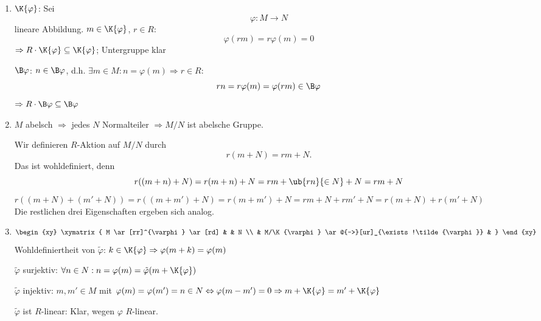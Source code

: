\begin{Bew}
\begin{enumerate}
\item $\K{\varphi}$: Sei 
\[
\varphi: M \to N
\]
 lineare Abbildung. $m \in \K{\varphi}$, $r \in R$:
\[
\varphi(rm) = r\varphi(m) = 0
\] 
$\Rightarrow R \cdot \K{\varphi} \subseteq \K{\varphi}$; Untergruppe klar

$\B\varphi$: $n \in \B\varphi$, d.h. $\exists m\in M: n =
\varphi (m) \Rightarrow r \in R:$
\[
rn = r \varphi(m) = \varphi(rm) \in \B\varphi
\]
$\Rightarrow R
\cdot \B\varphi \subseteq \B\varphi$
\item $M$ abelsch $\Rightarrow$ jedes $N$ Normalteiler $\Rightarrow M/N$ ist
abelsche Gruppe.

Wir definieren $R$-Aktion auf $M/N$ durch
\[
r(m + N) = rm + N.
\]
Das ist wohldefiniert, denn
\[
r((m+n)+N)=r(m+n) + N= rm + \ub{rn}{\in N} + N = rm + N
\]
$r((m+N) + (m' + N ) ) = r((m+m')+N) = r(m+m') + N = rm + N + rm' + N =
r(m+N) + r(m'+N)$\\
Die restlichen drei Eigenschaften ergeben sich analog.
  
\item
$$\begin{xy}
\xymatrix{
M \ar[rr]^{\varphi} \ar[rd] &     &  N \\
&  M/\K{\varphi} \ar@{-->}[ur]_{\exists!\tilde{\varphi}}  & }
\end{xy}$$
Wohldefiniertheit von $\tilde{\varphi}$:
$k \in \K{\varphi}\Rightarrow \varphi(m+k) = \varphi(m)$

$\tilde{\varphi}$ surjektiv: $\forall n \in N: n = \varphi(m) =
\tilde{\varphi}(m+ \K{\varphi})$

$\tilde{\varphi}$ injektiv: $m, m' \in M$ mit $\varphi(m) = \varphi(m') = n
\in N \Leftrightarrow 
\varphi(m-m') = 0 \Rightarrow m + \K{\varphi} = 
m' + \K{\varphi}$

$\tilde{\varphi}$ ist $R$-linear: Klar, wegen $\varphi$ $R$-linear.
\end{enumerate}
\end{Bew}

